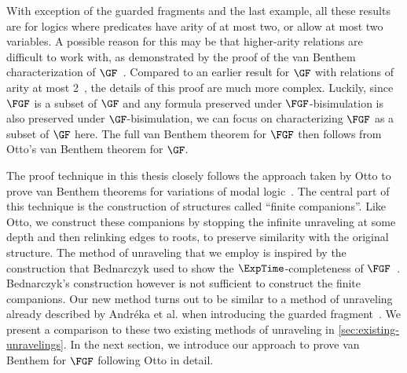With exception of the guarded fragments and the last example, all these results are for logics where predicates have arity of at most two, or allow at most two variables.
A possible reason for this may be that higher-arity relations are difficult to work with, as demonstrated by the proof of the van Benthem characterization of $\GF$~\cite{Otto2012}.
Compared to an earlier result for $\GF$ with relations of arity at most 2~\cite{Otto04}, the details of this proof are much more complex.
Luckily, since $\FGF$ is a subset of $\GF$ and any formula preserved under $\FGF$-bisimulation is also preserved under $\GF$-bisimulation, we can focus on characterizing $\FGF$ as a subset of $\GF$ here.
The full van Benthem theorem for $\FGF$ then follows from Otto's van Benthem theorem for $\GF$.

The proof technique in this thesis closely follows the approach taken by Otto to prove van Benthem theorems for variations of modal logic~\cite{Otto04, otto2004a}.
The central part of this technique is the construction of structures called ``finite companions''.
Like Otto, we construct these companions by stopping the infinite unraveling at some depth and then relinking edges to roots, to preserve similarity with the original structure.
The method of unraveling that we employ is inspired by the construction that Bednarczyk used to show the $\ExpTime$-completeness of $\FGF$~\cite{Bednarczyk21}.
Bednarczyk's construction however is not sufficient to construct the finite companions.
Our new method turns out to be similar to a method of unraveling already described by Andréka et al. when introducing the guarded fragment~\cite{AndrekaNB98}.
We present a comparison to these two existing methods of unraveling in \cref{sec:existing-unravelings}.
In the next section, we introduce our approach to prove van Benthem for $\FGF$ following Otto in detail.

